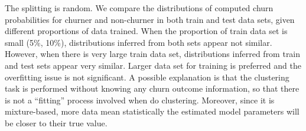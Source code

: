 The splitting is random. We compare the distributions of computed churn probabilities for churner and non-churner in both train and test data sets, given different proportions of data trained. When the proportion of train data set is small (5\%, 10\%), distributions inferred from both sets appear not similar. However, when there is very large train data set, distributions inferred from train and test sets appear very similar. Larger data set for training is preferred and the overfitting issue is not significant. A possible explanation is that the clustering task is performed without knowing any churn outcome information, so that there is not a ``fitting'' process involved when do clustering. Moreover, since it is mixture-based, more data mean statistically the estimated model parameters will be closer to their true value.